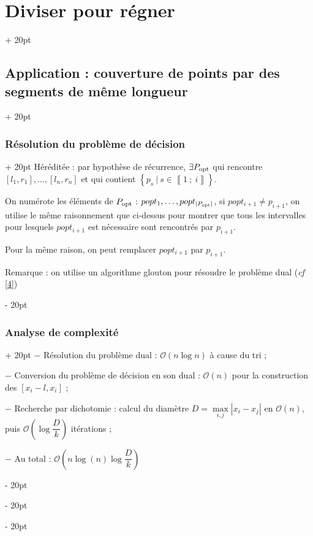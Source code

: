 \documentclass[a4paper, 12pt, twoside]{article}
\newcommand{\nset}[2]{\left\llbracket #1\ ;\ #2 \right\rrbracket}
\newcommand{\lr}[1]{\left( #1 \right)}
\newcommand{\set}[1]{\left\{ #1 \right\}}
\newcommand{\abs}[1]{\left\lvert #1 \right\rvert} %
\newcommand{\ind}[1][20pt]{\advance\leftskip + #1}
\newcommand{\deind}[1][20pt]{\advance\leftskip - #1}
\newenvironment{indt}[2][20pt]{#2 \par \ind[#1]}{\par \deind} %
\begin{document}
\begin{indt}{\section{Diviser pour régner}}
\begin{indt}{\subsection{Application : couverture de points par des segments de même longueur}}
\begin{indt}{\subsubsection{Résolution du problème de décision}}
                Héréditée : par hypothèse de récurrence, $\exists P_{\rm opt}$ qui rencontre $[l_1, r_1], \ldots, [l_n, r_n]$ et qui contient $\set{p_s\ |\ s \in \nset 1 i}$.
                
                On numérote les éléments de $P_{\rm opt}$ : $popt_1, \ldots, popt_{\abs{P_{\rm opt}}}$, si $popt_{i + 1} \neq p_{i + 1}$, on utilise le même raisonnement que ci-dessus pour montrer que tous les intervalles pour lesquels $popt_{i + 1}$ est nécessaire sont rencontrés par $p_{i + 1}$.
                
                Pour la même raison, on peut remplacer $popt_{i + 1}$ par $p_{i + 1}$.
                
                \vspace{12pt}
                
                Remarque : on utilise un algorithme glouton pour résoudre le problème dual (\textit{cf} \ref{4})
            \end{indt}
            
            \vspace{12pt}
            
            \begin{indt}{\subsubsection{Analyse de complexité}}
                $-$ Résolution du problème dual : $\mathcal O(n\log n)$ à cause du tri ;
                
                $-$ Conversion du problème de décision en son dual : $\mathcal O(n)$ pour la construction des $[x_i - l, x_i]$ ;
                
                $-$ Recherche par dichotomie : calcul du diamètre $D = \max\limits_{i, j}\abs{x_i - x_j}$ en $\mathcal O(n)$, puis $\mathcal O\lr{\log \dfrac D k}$ itérations ;
                
                $-$ Au total : $\mathcal O\lr{n\log(n) \log \dfrac D k}$
            \end{indt}
        \end{indt}
        
    \end{indt}
    
    \vspace{12pt}
    
\end{document}
